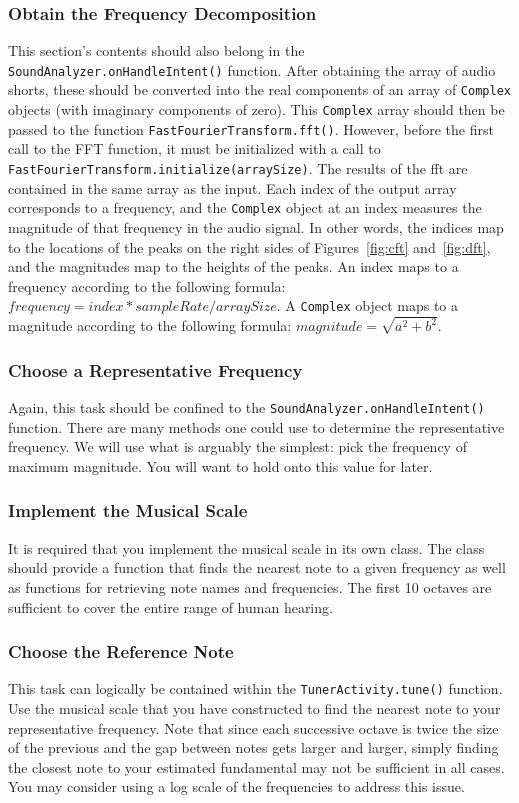 \subsubsection{Obtain the Frequency Decomposition}
This section's contents should also belong in the \verb=SoundAnalyzer.onHandleIntent()= function.
After obtaining the array of audio shorts, these should be converted into the real components of an array of \verb=Complex= objects (with imaginary components of zero).
This \verb=Complex= array should then be passed to the function \verb=FastFourierTransform.fft()=.
However, before the first call to the FFT function, it must be initialized with a call to \verb=FastFourierTransform.initialize(arraySize)=.
The results of the \ac{fft} are contained in the same array as the input.
Each index of the output array corresponds to a frequency, and the \verb=Complex= object at an index measures the magnitude of that frequency in the audio signal.
In other words, the indices map to the locations of the peaks on the right sides of Figures~\ref{fig:cft} and~\ref{fig:dft}, and the magnitudes map to the heights of the peaks.
An index maps to a frequency according to the following formula: $frequency = index*sampleRate/arraySize$.
A \verb=Complex= object maps to a magnitude according to the following formula: $magnitude = \sqrt{a^2 + b^2}$.

\subsubsection{Choose a Representative Frequency}
Again, this task should be confined to the \verb=SoundAnalyzer.onHandleIntent()= function.
There are many methods one could use to determine the representative frequency.
We will use what is arguably the simplest: pick the frequency of maximum magnitude.
You will want to hold onto this value for later.

\subsubsection{Implement the Musical Scale}
It is required that you implement the musical scale in its own class.
The class should provide a function that finds the nearest note to a given frequency as well as functions for retrieving note names and frequencies.
The first 10 octaves are sufficient to cover the entire range of human hearing.

\subsubsection{Choose the Reference Note}
This task can logically be contained within the \verb=TunerActivity.tune()= function.
Use the musical scale that you have constructed to find the nearest note to your representative frequency.
Note that since each successive octave is twice the size of the previous and the gap between notes gets larger and larger, simply finding the closest note to your estimated fundamental may not be sufficient in all cases.
You may consider using a log scale of the frequencies to address this issue.

